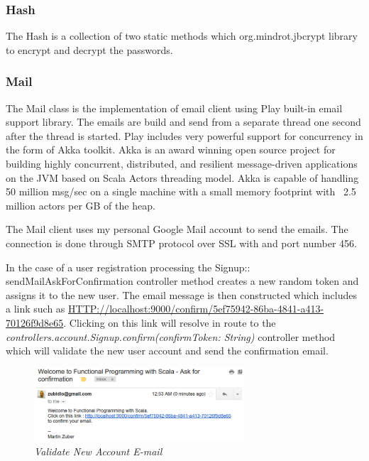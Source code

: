 \documentclass[12pt,twoside,a4paper]{report}
\begin{document}
\subsubsection{Hash}
The Hash is a collection of two static methods which org.mindrot.jbcrypt library to encrypt and decrypt the passwords.

\subsubsection{Mail}
The Mail class is the implementation of email client using Play built-in email support library. The emails are build and send from a separate thread one second after the thread is started. Play includes very powerful support for concurrency in the form of Akka toolkit.\cite{33} Akka is an award winning open source project for building highly concurrent,
distributed, and resilient message-driven applications on the JVM based on Scala Actors threading model. Akka is capable of handling 50 million msg/sec on a single machine with a small memory footprint with ~2.5 million actors per GB of the heap.

The Mail client uses my personal Google Mail account to send the emails. The connection is done through SMTP protocol over SSL with and port number 456.

In the case of a user registration processing the Signup:: sendMailAskForConfirmation controller method creates a new random token and assigns it to the new user. The email message is then constructed which includes a link such as \url{ HTTP://localhost:9000/confirm/5ef75942-86ba-4841-a413-70126f9d8e65}. Clicking on this link will resolve in route to the \emph{controllers.account.Signup.confirm(confirmToken: String)} controller method which will validate the new user account and send the confirmation email.

\begin{figure}[!ht]
	\centering
		\includegraphics[width=0.7\textwidth, totalheight=4cm]
		{register_confirmation_email}
	\caption{\textit{Validate New Account E-mail}}
	\label{f4.4.1.1}
\end{figure}

\end{document}
